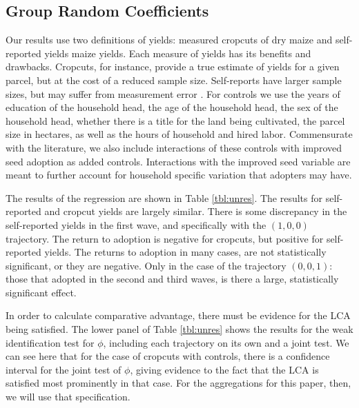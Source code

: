 \documentclass[11pt]{article}
\begin{document}
\subsection{Group Random Coefficients}

Our results use two definitions of yields: measured cropcuts of dry maize and self-reported yields maize yields. Each measure of yields has its benefits and drawbacks. Cropcuts, for instance, provide a true estimate of yields for a given parcel, but at the cost of a reduced sample size. Self-reports have larger sample sizes, but may suffer from measurement error \citep{gollin2021heterogeneity}. For controls we use the years of education of the household head, the age of the household head, the sex of the household head, whether there is a title for the land being cultivated, the parcel size in hectares, as well as the hours of household and hired labor. Commensurate with the literature, we also include interactions of these controls with improved seed adoption as added controls. Interactions with the improved seed variable are meant to further account for household specific variation that adopters may have. 



The results of the regression are shown in Table \ref{tbl:unres}. The results for self-reported and cropcut yields are largely similar. There is some discrepancy in the self-reported yields in the first wave, and specifically with the $(1,0,0)$ trajectory. The return to adoption is negative for cropcuts, but positive for self-reported yields. The returns to adoption in many cases, are not statistically significant, or they are negative. Only in the case of the trajectory $(0,0,1)$: those that adopted in the second and third waves, is there a large, statistically significant effect. 

In order to calculate comparative advantage, there must be evidence for the LCA being satisfied. The lower panel of  Table \ref{tbl:unres} shows the results for the weak identification test for $\phi$, including each trajectory on its own and a joint test. We can see here that for the case of cropcuts with controls, there is a confidence interval for the joint test of $\phi$, giving evidence to the fact that the LCA is satisfied most prominently in that case. For the aggregations for this paper, then, we will use that specification.
\end{document}
